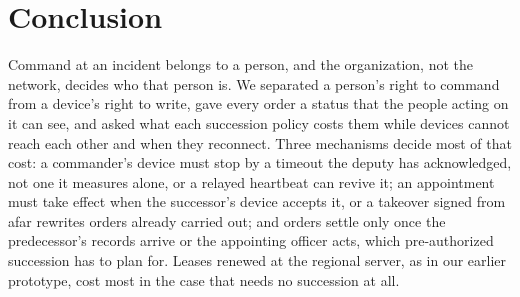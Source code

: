 \section{Conclusion}
\label{sec:conclusion}

Command at an incident belongs to a person, and the organization, not the network, decides
who that person is. We separated a person's right to command from a device's right to
write, gave every order a status that the people acting on it can see, and asked what each
succession policy costs them while devices cannot reach each other and when they
reconnect. Three mechanisms decide most of that cost: a commander's device must stop by a
timeout the deputy has acknowledged, not one it measures alone, or a relayed heartbeat can
revive it; an appointment must take effect when the successor's device accepts it, or a
takeover signed from afar rewrites orders already carried out; and orders settle only once
the predecessor's records arrive or the appointing officer acts, which pre-authorized
succession has to plan for. Leases renewed at the regional server, as in our earlier
prototype, cost most in the case that needs no succession at all.

